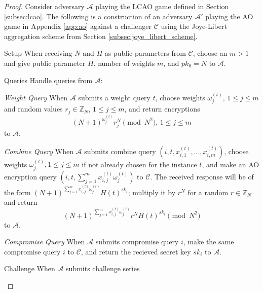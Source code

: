 \documentclass[10pt,journal,compsoc]{IEEEtran}
\theoremstyle{definition}
\theoremstyle{definition}
\theoremstyle{remark}
\begin{document}
\begin{proof}
    Consider adversary $\mathcal{A}$ playing the LCAO game defined in Section \ref{subsec:lcao}. The following is a construction of an adversary $\mathcal{A}'$ playing the AO game in Appendix \ref{app:ao} against a challenger $\mathcal{C}$ using the Joye-Libert aggregation scheme from Section \ref{subsec:joye_libert_scheme}.
    \begin{LaTeXdescription}
        \item[Setup] When receiving $N$ and $H$ as public parameters from $\mathcal{C}$, choose an $m>1$ and give public parameter $H$, number of weights $m$, and $pk_0=N$ to $\mathcal{A}$.
        \item[Queries] Handle queries from $\mathcal{A}$:
        \begin{LaTeXdescription}
            \item[\textit{Weight Query}] When $\mathcal{A}$ submits a weight query $t$, choose weights $\omega^{(t)}_j,\,1 \leq j \leq m$ and random values $r_j \in \mathbb{Z}_N,\,1 \leq j \leq m$, and return encryptions 
            \begin{equation*}
                (N+1)^{\omega^{(t)}_{j}}r_j^N\pmod{N^2},\,1\leq j\leq m
            \end{equation*}
            to $\mathcal{A}$.
            \item[\textit{Combine Query}] When $\mathcal{A}$ submits combine query $(i, t, x^{(t)}_{i,1},\dots,x^{(t)}_{i,m})$, choose weights $\omega^{(t)}_j,1 \leq j \leq m$ if not already chosen for the instance $t$, and make an AO encryption query $(i, t, \sum^m_{j=1}x^{(t)}_{i,j}\omega^{(t)}_j)$ to $\mathcal{C}$. The received response will be of the form $(N+1)^{\sum^m_{j=1}x^{(t)}_{i,j}\omega^{(t)}_j}H(t)^{sk_i}$; multiply it by $r^N$ for a random $r \in \mathbb{Z}_N$ and return 
            \begin{equation*}
                (N+1)^{\sum^m_{j=1}x^{(t)}_{i,j}\omega^{(t)}_j}r^N H(t)^{sk_i} \pmod{N^2}
            \end{equation*}
            to $\mathcal{A}$.
            \item[\textit{Compromise Query}] When $\mathcal{A}$ submits compromise query $i$, make the same compromise query $i$ to $\mathcal{C}$, and return the recieved secret key $sk_i$ to $\mathcal{A}$.
        \end{LaTeXdescription}
        \item[Challenge] When $\mathcal{A}$ submits challenge series
        \begin{equation*}

\end{equation*}
\end{LaTeXdescription}
\end{proof}
\end{document}
